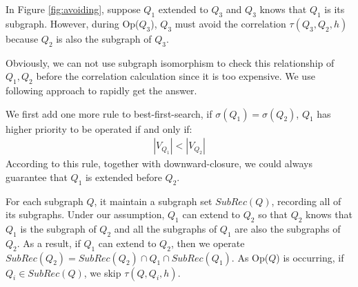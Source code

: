 \begin{exple}
	In Figure \ref{fig:avoiding}, suppose $Q_1$ extended to $Q_3$ and $Q_3$ knows that $Q_1$ is its subgraph. However, during {\sf Op($Q_3$)}, $Q_3$ must avoid the correlation $\tau(Q_3,Q_2,h)$ because $Q_2$ is also the subgraph of $Q_3$. 
\end{exple}


Obviously, we can not use subgraph isomorphism to check this relationship of $Q_1,Q_2$ before the correlation calculation since it is too expensive. We use following approach to rapidly get the answer.
\par We first add one more rule to best-first-search, if $\sigma(Q_1)=\sigma(Q_2)$, $Q_1$ has higher priority to be operated if and only if:
	\begin{align*} |V_{Q_1}|<|V_{Q_2}| \end{align*}
According to this rule, together with downward-closure, we could always guarantee that $Q_1$ is extended before $Q_2$.
\par For each subgraph $Q$, it maintain a subgraph set $SubRec(Q)$, recording all of its subgraphs. Under our assumption, $Q_1$ can extend to $Q_2$ so that $Q_2$ knows that $Q_1$ is the subgraph of $Q_2$ and all the subgraphs of $Q_1$ are also the subgraphs of $Q_2$. As a result, if $Q_1$ can extend to $Q_2$, then we operate $SubRec(Q_2)=SubRec(Q_2)\cap Q_1\cap SubRec(Q_1)$. As {\sf Op($Q$)} is occurring, if $Q_i\in SubRec(Q)$, we skip $\tau(Q,Q_i,h)$.
\newline
